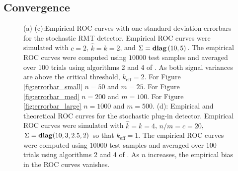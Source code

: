 \subsection{Convergence}
\begin{figure}[t]
\centering
{}
\caption{(a)-(c):Empirical ROC curves with one standard deviation errorbars for the stochastic RMT detector. Empirical ROC curves were simulated with $c=2$, $\widehat{k}=k=2$, and $\Sigma =\mathop{\bf diag}\left(10,5\right)$. The empirical ROC curves were computed using $10000$ test samples and averaged over 100 trials using algorithms 2 and 4 of \cite{fawcett2006introduction}. As both signal variances are above the critical threshold, $k_{\text{eff}} = 2$. For Figure \ref{fig:errorbar_small} $n=50$ and $m=25$. For Figure \ref{fig:errorbar_med} $n=200$ and $m=100$. For Figure \ref{fig:errorbar_large} $n=1000$ and $m=500$. (d): Empirical and theoretical ROC curves for the stochastic plug-in detector. Empirical ROC curves were simulated with $\widehat{k}=k=4$, $n/m=c=20$, $\Sigma=\mathop{\bf diag}(10, 3, 2.5, 2)$ so that $k_\text{eff}=1$. The empirical ROC curves were computed using $10000$ test samples and averaged over 100 trials using algorithms 2 and 4 of \cite{fawcett2006introduction}. As $n$ increases, the empirical bias in the ROC curves vanishes.}
\end{figure}

